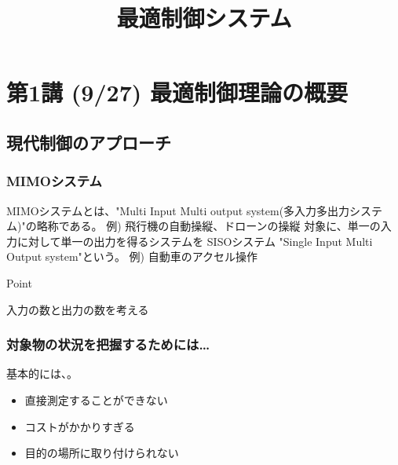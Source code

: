 \documentclass[a4paper]{jsarticle}
\author{}
\title{最適制御システム}
\date{}
\begin{document}
\maketitle
\section{第1講 (9/27) 最適制御理論の概要}
\subsection{現代制御のアプローチ}
\subsubsection{MIMOシステム}
MIMOシステムとは、"Multi Input Multi output system(多入力多出力システム)"の略称である。
例) 飛行機の自動操縦、ドローンの操縦
対象に、単一の入力に対して単一の出力を得るシステムを SISOシステム "Single Input Multi Output system"という。
例) 自動車のアクセル操作
\begin{itembox}[l]{Point}
    \begin{center}
        入力の数と出力の数を考える
    \end{center}
\end{itembox}
\subsubsection{対象物の状況を把握するためには…}
基本的には、。
\begin{itemize}
    \item 直接測定することができない
    \item コストがかかりすぎる
    \item 目的の場所に取り付けられない
\end{itemize}
\end{document}
